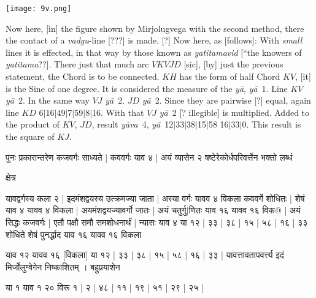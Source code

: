 \documentclass[12pt]{book}
\def\ya{\textit{y\=a}}
\def\yava{\textit{y\=ava}}
\def\danda{$|$}
\begin{document}
\begin{center}
\texttt{[image: 9v.png]}
\end{center}

\newpage

Now here, [in] the figure shown by Mirjolugvega with the second method, there 
the contact of a \textit{vadgu}-line [???] is made. [?]  Now here, as [follows]:  
With \emph{small} lines 
it is effected, in that way by those known as \textit{yatitamavid} [``the knowers of
\textit{yatitama}??].  There just that much arc $VKVJD$ [sic], [by] just the previous
statement, the Chord is to be connected. $KH$ has the form of half Chord $KV$, 
[it] is the Sine of one degree. It is considered the measure of the \ya, \ya\ 1.
Line $KV$ \ya\ 2. In the same way $VJ$ \ya\ 2. $JD$ \ya\ 2. Since they are 
pairwise [?] equal, again line $KD$
6\danda 16\danda 49\danda 7\danda 59\danda 8\danda 16. 
With that $VJ$ \ya\ 2 [? illegible] is multiplied. Added to the product of
$KV$, $JD$, result \yava\ 4, \ya\ 12\danda 33\danda 38\danda 15\danda 58
16\danda 33\danda 0. This result is the square of $KJ$. \\

\iffalse 
\begin{center}
\texttt{[image: 9v.png]}
\captionof{figure}{9v}
\end{center}
\fi 

\newpage

{\s पुनः प्रकारान्तरेण कजवर्गः साध्यते | कववर्गः याव ४ |
अयं व्यासेन २ षष्टेरेकोर्धपरिवर्त्तेन भक्तो लब्धं

क्षेत्र

यावद्वर्गस्य कला २ | इदमंशद्वयस्य उत्क्रमज्या जाता | अस्या वर्गः यावव ४
विकला कववर्गे शोधितः | शेषं याव ४ यावव ४ विकला | अयमंशद्वयज्यावर्गो
जातः | अयं चतुर्गु$|$णितः
 याव १६ यावव १६ विक@ | अयं
सिद्धः कजवर्गः | एतौ पक्षौ समौ समशोधनार्थं | न्यासः याव ४ या १२ |
३३ | ३८ | १५ | ५८ | १६ | ३३ शोधिते शेषं पुनर्द्धाद 
याव १६ यावव १६ विकला

याव १२
यावव १६ [विकला] या १२ | ३३ | ३८ | १५ | ५८ | १६ | ३३ | यावत्तावतापवर्त्त्य इदं मिर्जोलुग्वेगेन निष्काशितम् । बहुप्रयाशेन

या १ याव १ २० विरू १ | २ | ४८ | ११ | १९ | ५१ | २९ | २५ |} 

\newpage
\end{document}
